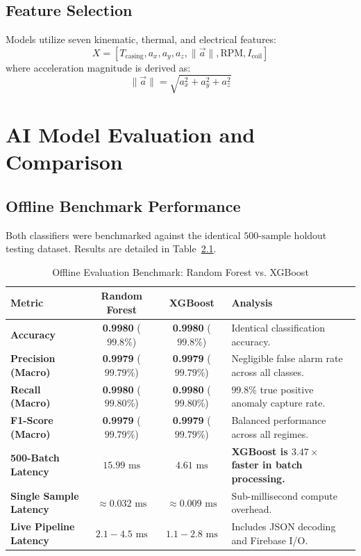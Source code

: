 \documentclass[12pt,a4paper]{report}
\begin{document}
\section{Feature Selection}
Models utilize seven kinematic, thermal, and electrical features:
\begin{equation}
    X = \left[ T_{\text{casing}}, a_x, a_y, a_z, \|\vec{a}\|, \text{RPM}, I_{\text{coil}} \right]
\end{equation}
where acceleration magnitude is derived as:
\begin{equation}
    \|\vec{a}\| = \sqrt{a_x^2 + a_y^2 + a_z^2}
\end{equation}

\chapter{AI Model Evaluation and Comparison}

\section{Offline Benchmark Performance}
Both classifiers were benchmarked against the identical $500\text{-sample}$ holdout testing dataset. Results are detailed in Table~\ref{tab:model_comparison}.

\begin{table}[H]
\centering
\caption{Offline Evaluation Benchmark: Random Forest vs. XGBoost}
\label{tab:model_comparison}
\begin{tabular}{l c c p{4.5cm}}
\toprule
\textbf{Metric} & \textbf{Random Forest} & \textbf{XGBoost} & \textbf{Analysis} \\
\midrule
\textbf{Accuracy} & \textbf{0.9980} ($99.8\%$) & \textbf{0.9980} ($99.8\%$) & Identical classification accuracy. \\
\textbf{Precision (Macro)} & \textbf{0.9979} ($99.79\%$) & \textbf{0.9979} ($99.79\%$) & Negligible false alarm rate across all classes. \\
\textbf{Recall (Macro)} & \textbf{0.9980} ($99.80\%$) & \textbf{0.9980} ($99.80\%$) & $99.8\%$ true positive anomaly capture rate. \\
\textbf{F1-Score (Macro)} & \textbf{0.9979} ($99.79\%$) & \textbf{0.9979} ($99.79\%$) & Balanced performance across all regimes. \\
\midrule
\textbf{500-Batch Latency} & $15.99\text{ ms}$ & \textbf{$4.61\text{ ms}$} & \textbf{XGBoost is $3.47\times$ faster in batch processing.} \\
\textbf{Single Sample Latency} & $\approx 0.032\text{ ms}$ & \textbf{$\approx 0.009\text{ ms}$} & Sub-millisecond compute overhead. \\
\textbf{Live Pipeline Latency} & $2.1 - 4.5\text{ ms}$ & \textbf{$1.1 - 2.8\text{ ms}$} & Includes JSON decoding and Firebase I/O. \\
\bottomrule
\end{tabular}
\end{table}
\end{document}
